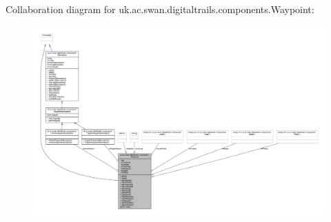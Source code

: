 Collaboration diagram for uk.\+ac.\+swan.\+digitaltrails.\+components.\+Waypoint\+:
\nopagebreak
\begin{figure}[H]
\begin{center}
\leavevmode
\includegraphics[width=350pt]{classuk_1_1ac_1_1swan_1_1digitaltrails_1_1components_1_1_waypoint__coll__graph}
\end{center}
\end{figure}
